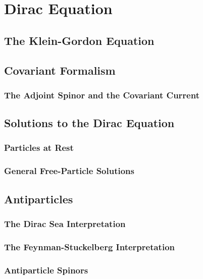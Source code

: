 \chapter{Dirac Equation}
\section{The Klein-Gordon Equation}
\section{Covariant Formalism}
\subsection{The Adjoint Spinor and the Covariant Current}
\section{Solutions to the Dirac Equation}
\subsection{Particles at Rest}
\subsection{General Free-Particle Solutions}
\section{Antiparticles}
\subsection{The Dirac Sea Interpretation}
\subsection{The Feynman-Stuckelberg Interpretation}
\subsection{Antiparticle Spinors}